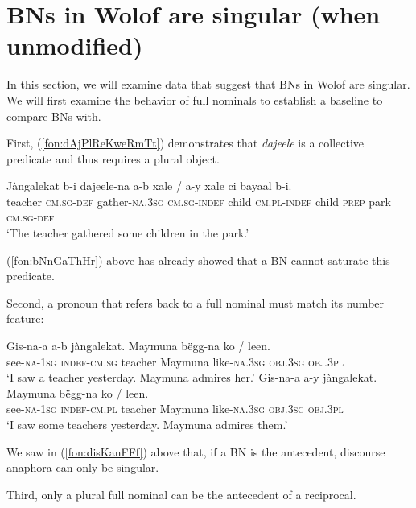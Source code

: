 \documentclass[output=paper]{langscibook}
\begin{document}
\section{BNs in Wolof are singular (when unmodified)}
\label{fon:sEk:BnNSgG}

In this section, we will examine data that suggest that BNs in Wolof are singular. We will first examine the behavior of full nominals to establish a baseline to compare BNs with.

First, (\ref{fon:dAjPlReKweRmTt}) demonstrates that \textit{dajeele} is a collective predicate and thus requires a plural object.
	
	\ea \gll	J\`{a}ngalekat b-i dajeele-na \minsp{*} a-b xale / a-y xale ci bayaal b-i.\\
			teacher \textsc{cm.sg-def} gather-\textsc{na.3sg} {} \textsc{cm.sg-indef} child {} \textsc{cm.pl-indef} child \textsc{prep} park \textsc{cm.sg-def}\\
			\glt `The teacher gathered some children in the park.'\label{fon:dAjPlReKweRmTt}
	\z

\noindent   (\ref{fon:bNnGaThHr}) above has already showed that a BN cannot saturate this predicate.
	
Second, a pronoun that refers back to a full nominal must match its number feature:
	
	\ea
		\ea \gll	Gis-na-a a-b j\`{a}ngalekat. Maymuna b\"{e}gg-na ko /\hspace{5pt} \minsp{*} leen.\\
					see-\textsc{na-1sg} \textsc{indef-cm.sg} teacher Maymuna like-\textsc{na.3sg} \textsc{obj.3sg} {} {} \textsc{obj.3pl}\\
					\glt   `I saw a teacher yesterday. Maymuna admires her.'
		\ex \gll	Gis-na-a a-y j\`{a}ngalekat. Maymuna b\"{e}gg-na \minsp{*} ko / leen.\\
					see-\textsc{na-1sg} \textsc{indef-cm.pl} teacher Maymuna like-\textsc{na.3sg} {} \textsc{obj.3sg} {} \textsc{obj.3pl}\\
					\glt   `I saw some teachers yesterday. Maymuna admires them.'
		\z
	\z

\noindent   We saw in (\ref{fon:disKanFFf}) above that, if a BN is the antecedent, discourse anaphora can only be singular.
	
Third, only a plural full nominal can be the antecedent of a reciprocal.
	
	\ea
	    \label{fon:waNAleNoPeGaPe1}
	    \label{fon:waNAleNoPe1}
		\z
	\z
\end{document}

